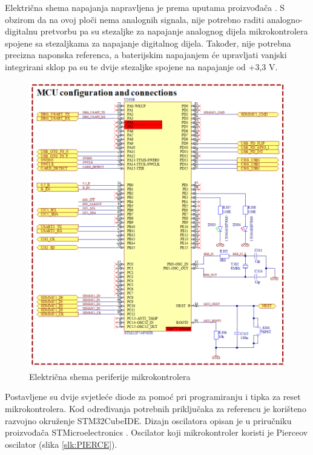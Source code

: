 Električna shema napajanja napravljena je prema uputama proizvođača \cite{stmicroelectronics:an4661}. S obzirom da na ovoj ploči nema analognih signala, nije potrebno raditi analogno-digitalnu pretvorbu pa su stezaljke za napajanje analognog dijela mikrokontrolera spojene sa stezaljkama za napajanje digitalnog dijela. Također, nije potrebna precizna naponska referenca, a baterijskim napajanjem će upravljati vanjski integrirani sklop pa su te dvije stezaljke spojene na napajanje od +3,3 V.
\begin{figure}[H]
    \centering
    \includegraphics[width=\textwidth]{Figures/MCU_01.png}
    \caption{Električna shema periferije mikrokontrolera}
    \label{slk:MCU_PE}
\end{figure}
Postavljene su dvije svjetleće diode za pomoć pri programiranju i tipka za reset mikrokontrolera. Kod određivanja potrebnih priključaka za referencu je korišteno razvojno okruženje STM32CubeIDE. Dizajn oscilatora opisan je u priručniku proizvođača STMicroelectronics \cite{stmicroelectronics:an2867}. Oscilator koji mikrokontroler koristi je Pierceov oscilator (slika \ref{slk:PIERCE}).
